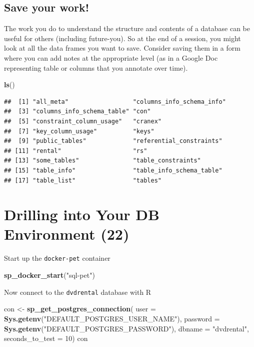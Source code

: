 \documentclass[]{book}
\newenvironment{Shaded}{\begin{snugshade}}{\end{snugshade}}
\newcommand{\DataTypeTok}[1]{\textcolor[rgb]{0.13,0.29,0.53}{#1}}
\newcommand{\DecValTok}[1]{\textcolor[rgb]{0.00,0.00,0.81}{#1}}
\newcommand{\KeywordTok}[1]{\textcolor[rgb]{0.13,0.29,0.53}{\textbf{#1}}}
\newcommand{\NormalTok}[1]{#1}
\newcommand{\StringTok}[1]{\textcolor[rgb]{0.31,0.60,0.02}{#1}}
\theoremstyle{definition}
\theoremstyle{definition}
\theoremstyle{definition}
\theoremstyle{remark}
\begin{document}
\hypertarget{save-your-work}{%
\section{Save your work!}\label{save-your-work}}

The work you do to understand the structure and contents of a database
can be useful for others (including future-you). So at the end of a
session, you might look at all the data frames you want to save.
Consider saving them in a form where you can add notes at the
appropriate level (as in a Google Doc representing table or columns that
you annotate over time).

\begin{Shaded}
\begin{Highlighting}[]
\KeywordTok{ls}\NormalTok{()}
\end{Highlighting}
\end{Shaded}

\begin{verbatim}
##  [1] "all_meta"                  "columns_info_schema_info" 
##  [3] "columns_info_schema_table" "con"                      
##  [5] "constraint_column_usage"   "cranex"                   
##  [7] "key_column_usage"          "keys"                     
##  [9] "public_tables"             "referential_constraints"  
## [11] "rental"                    "rs"                       
## [13] "some_tables"               "table_constraints"        
## [15] "table_info"                "table_info_schema_table"  
## [17] "table_list"                "tables"
\end{verbatim}

\hypertarget{drilling-into-your-db-environment-22}{%
\chapter{Drilling into Your DB Environment
(22)}\label{drilling-into-your-db-environment-22}}

Start up the \texttt{docker-pet} container

\begin{Shaded}
\begin{Highlighting}[]
\KeywordTok{sp_docker_start}\NormalTok{(}\StringTok{"sql-pet"}\NormalTok{)}
\end{Highlighting}
\end{Shaded}

Now connect to the \texttt{dvdrental} database with R

\begin{Shaded}
\begin{Highlighting}[]
\NormalTok{con <-}\StringTok{ }\KeywordTok{sp_get_postgres_connection}\NormalTok{(}
  \DataTypeTok{user =} \KeywordTok{Sys.getenv}\NormalTok{(}\StringTok{"DEFAULT_POSTGRES_USER_NAME"}\NormalTok{),}
  \DataTypeTok{password =}  \KeywordTok{Sys.getenv}\NormalTok{(}\StringTok{"DEFAULT_POSTGRES_PASSWORD"}\NormalTok{),}
  \DataTypeTok{dbname =} \StringTok{"dvdrental"}\NormalTok{,}
  \DataTypeTok{seconds_to_test =} \DecValTok{10}\NormalTok{)}
\NormalTok{con}
\end{Highlighting}
\end{Shaded}
\end{document}
